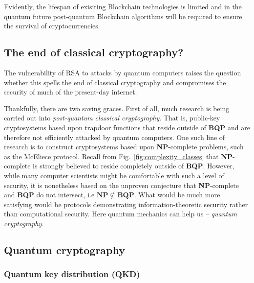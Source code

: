 Evidently, the lifespan of exisiting Blockchain technologies is limited and in the quantum future post-quantum Blockchain algorithms will be required to ensure the survival of cryptocurrencies.

%
%

\subsection{The end of classical cryptography?} \label{sec:end_of_class_crypto}

The vulnerability of RSA to attacks by quantum computers raises the question whether this spells the end of classical cryptography and compromises the security of much of the present-day internet.

Thankfully, there are two saving graces. First of all, much research is being carried out into \textit{post-quantum classical cryptography}. That is, public-key cryptosystems based upon trapdoor functions that reside outside of \textbf{BQP} and are therefore not efficiently attacked by quantum computers. One such line of research is to construct cryptosystems based upon \textbf{NP}-complete problems, such as the McEliece protocol. Recall from Fig.~\ref{fig:complexity_classes} that \textbf{NP}-complete is strongly believed to reside completely outside of \textbf{BQP}. However, while many computer scientists might be comfortable with such a level of security, it is nonetheless based on the unproven conjecture that \textbf{NP}-complete and \textbf{BQP} do not intersect, i.e \mbox{$\mathbf{NP}\nsubseteq\mathbf{BQP}$}. What would be much more satisfying would be protocols demonstrating information-theoretic security rather than computational security. Here quantum mechanics can help us -- \textit{quantum cryptography}.

%
%

\subsection{Quantum cryptography}

%
%

\subsubsection{Quantum key distribution (QKD)} \label{sec:QKD} 

